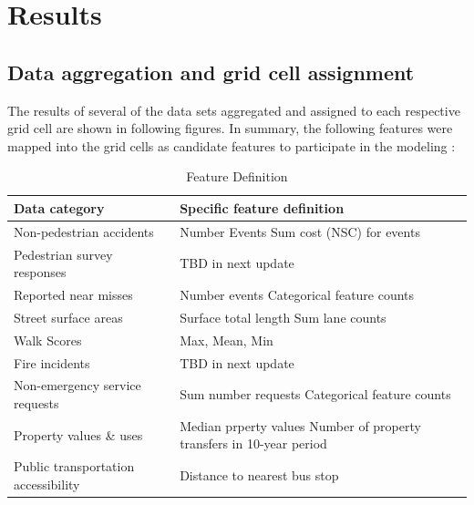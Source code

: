 \documentclass{llncs}
\begin{document}
\section{Results}
%
\subsection{Data aggregation and grid cell assignment}

The results of several of the data sets aggregated and assigned to each respective grid cell are shown in following figures. In summary, the following features were mapped into the grid cells as candidate features to participate in the modeling :

\FloatBarrier
\begin{table}
\begin{center}
\caption{Feature Definition}
\label{table : featureDefinition}
\begin{tabular}{p{50mm} p{60mm}}
\hline
\rule{0pt}{12pt}
Data category & Specific feature definition	\\[2pt]
\hline
Non-pedestrian accidents 		& Number Events \newline
															Sum cost (NSC) for events \\
Pedestrian survey responses & TBD in next update \\
Reported near misses 				& Number events \newline
                                                            Categorical feature counts \\
Street surface areas 				& Surface total length \newline
                                                            Sum lane counts  \\
Walk Scores 								& Max, Mean, Min  \\
Fire incidents 								& TBD in next update  \\
Non-emergency service requests & Sum number requests \newline
                                                                      Categorical feature counts\\ 
Property values \& uses 			& Median prperty values \newline
                                                            Number of property transfers in 10-year period  \\
Public transportation accessibility & Distance to nearest bus stop \\[2pt]
\hline
\end{tabular}
\end{center}
\end{table}
\FloatBarrier
%
\end{document}

